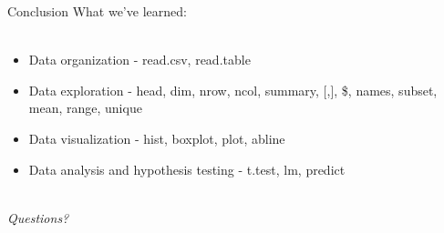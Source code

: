 \documentclass[xcolor=svgnames]{beamer}
\begin{document}
\begin{frame}{Conclusion}
What we've learned:\\~\\
\begin{itemize}
\itemsep20pt
\item Data organization - read.csv, read.table
\item Data exploration - head, dim, nrow, ncol, summary, [,], \$, names, subset, mean, range, unique
\item Data visualization - hist, boxplot, plot, abline
\item Data analysis and hypothesis testing - t.test, lm, predict\\~\\
\end{itemize}
\LARGE
\centerline{\emph{Questions?}}
\end{frame}
\end{document}
